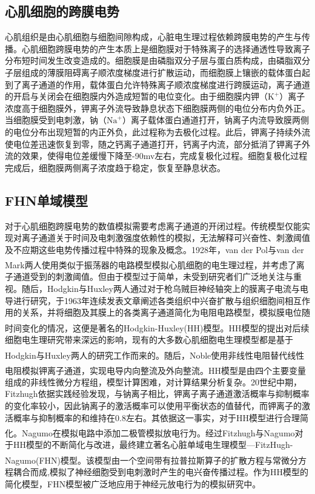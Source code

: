 \documentclass[twoside,UTF8]{nputhesis}
\newcommand{\upcite}[1]{\textsuperscript{\textsuperscript{\cite{#1}}}}
\begin{document}
\subsection{心肌细胞的跨膜电势}
心肌组织是由心肌细胞与细胞间隙构成，心脏电生理过程依赖跨膜电势的产生与传播。心肌细胞跨膜电势的产生本质上是细胞膜对于特殊离子的选择通透性导致离子分布短时间发生改变造成的。细胞膜是由磷脂双分子层与蛋白质构成，由磷脂双分子层组成的薄膜阻碍离子顺浓度梯度进行扩散运动，而细胞膜上镶嵌的载体蛋白起到了离子通道的作用，载体蛋白允许特殊离子顺浓度梯度进行跨膜运动，离子通道的开启与关闭会在细胞膜内外造成短暂的电位变化。由于细胞膜内钾（$\mathrm{K}^{+}$）离子浓度高于细胞膜外，钾离子外流导致静息状态下细胞膜两侧的电位分布内负外正。当细胞膜受到电刺激，钠（$\mathrm{Na}^{+}$）离子载体蛋白通道打开，钠离子内流导致膜两侧的电位分布出现短暂的内正外负，此过程称为去极化过程。此后，钾离子持续外流使电位差迅速恢复到零，随之钙离子通道打开，钙离子内流，部分抵消了钾离子外流的效果，使得电位差缓慢下降至-90mv左右，完成复极化过程。细胞复极化过程完成后，细胞膜两侧离子浓度趋于稳定，恢复至静息状态。                                                                                                                                                                           

\subsection{FHN单域模型}

对于心肌细胞跨膜电势的数值模拟需要考虑离子通道的开闭过程。传统模型仅能实现对离子通道关于时间及电刺激强度依赖性的模拟，无法解释可兴奋性、刺激阈值及不应期这些电势传播过程中特殊的现象及概念。1928年，van der Pol与van der Mark\upcite{van1928lxxii}两人使用类似于振荡器的电路模型模拟心肌细胞的电生理过程，并考虑了离子通道受到的刺激阈值。但由于模型过于简单，未受到研究者们广泛地关注与重视。随后，Hodgkin与Huxley两人通过对于枪乌贼巨神经轴突上的膜离子电流与电导进行研究，于1963年连续发表文章阐述各类组织中兴奋扩散与组织细胞间相互作用的关系，并将细胞及其膜上的各类离子通道简化为电阻电路模型，模拟膜电位随时间变化的情况，这便是著名的Hodgkin-Huxley(HH)模型\upcite{hodgkin1952quantitative}。HH模型的提出对后续细胞电生理研究带来深远的影响，现有的大多数心肌细胞电生理模型都是基于Hodgkin与Huxley两人的研究工作而来的\upcite{fitzhugh1961impulses,van1980computer}。随后，Noble使用非线性电阻替代线性电阻模拟钾离子通道，实现电导内向整流及外向整流\upcite{noble1962modification,noble1998improved}。HH模型是由四个主要变量组成的非线性微分方程组，模型计算困难，对计算结果分析复杂。20世纪中期，Fitzhugh依据实践经验发现，与钠离子相比，钾离子离子通道激活概率与抑制概率的变化率较小，因此钠离子的激活概率可以使用平衡状态的值替代，而钾离子的激活概率与抑制概率的和维持在0.8左右。其依据这一事实，对于HH模型进行合理简化\upcite{Fitzhugh1961Impulses}。Nagumo在模拟电路中添加二极管模拟放电行为\upcite{nagumo1962active}。经过Fitzhugh与Nagumo对于HH模型的不断简化与改进，最终建立著名心脏单域电生理模型—FitzHugh-Nagumo(FHN)模型\upcite{fitzhugh1955mathematical}。该模型由一个空间带有拉普拉斯算子的扩散方程与常微分方程耦合而成,模拟了神经细胞受到电刺激时产生的电兴奋传播过程。作为HH模型的简化模型，FHN模型被广泛地应用于神经元放电行为的模拟研究中。
\end{document}
